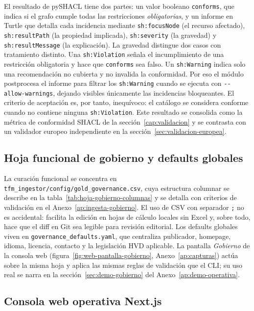 El resultado de pySHACL tiene dos partes: un valor booleano \texttt{conforms}, que indica si el grafo cumple todas las restricciones \emph{obligatorias}, y un informe en Turtle que detalla cada incidencia mediante \texttt{sh:focusNode} (el recurso afectado), \texttt{sh:resultPath} (la propiedad implicada), \texttt{sh:severity} (la gravedad) y \texttt{sh:resultMessage} (la explicación). La gravedad distingue dos casos con tratamiento distinto. Una \texttt{sh:Violation} señala el incumplimiento de una restricción obligatoria y hace que \texttt{conforms} sea falso. Un \texttt{sh:Warning} indica solo una recomendación no cubierta y no invalida la conformidad. Por eso el módulo postprocesa el informe para filtrar los \texttt{sh:Warning} cuando se ejecuta con \texttt{-{}-allow-warnings}, dejando visibles únicamente las incidencias bloqueantes. El criterio de aceptación es, por tanto, inequívoco: el catálogo se considera conforme cuando no contiene ninguna \texttt{sh:Violation}. Este resultado se consolida como la métrica de conformidad SHACL de la sección~\ref{cap:validacion} y se contrasta con un validador europeo independiente en la sección~\ref{sec:validacion-europea}.

\subsection{Hoja funcional de gobierno y defaults globales}\label{sec:implementacion-hoja}

La curación funcional se concentra en \texttt{tfm\_ingestor/config/gold\_governance.csv}, cuya estructura columnar se describe en la tabla~\ref{tab:hoja-gobierno-columnas} y se detalla con criterios de validación en el Anexo~\ref{ap:ingesta-gobierno}. El uso de \ac{CSV} con separador \texttt{;} no es accidental: facilita la edición en hojas de cálculo locales sin Excel y, sobre todo, hace que el diff en Git sea legible para revisión editorial. Los defaults globales viven en \texttt{governance\_defaults.yaml}, que centraliza publicador, homepage, idioma, licencia, contacto y la legislación \ac{HVD} aplicable. La pantalla \emph{Gobierno} de la consola web (figura~\ref{fig:web-pantalla-gobierno}, Anexo~\ref{ap:capturas}) actúa sobre la misma hoja y aplica las mismas reglas de validación que el \ac{CLI}; su uso real se narra en la sección~\ref{sec:demo-gobierno} del Anexo~\ref{ap:demo-operativa}.

\subsection{Consola web operativa Next.js}\label{sec:implementacion-web}

